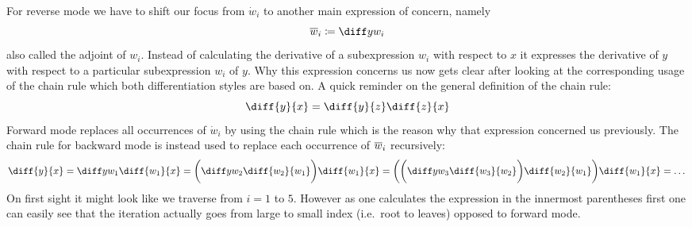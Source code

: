 For reverse mode we have to shift our focus from $\dot w_i$ to another main expression of concern, namely
\[ \overw{i} \coloneqq \diffyw{i} \]
also called the adjoint of $w_i$. Instead of calculating the derivative of a subexpression $w_i$ with respect to $x$ it expresses the derivative of $y$ with respect to a particular subexpression $w_i$ of $y$. Why this expression concerns us now gets clear after looking at the corresponding usage of the chain rule which both differentiation styles are based on. A quick reminder on the general definition of the chain rule:
\[ \diff{y}{x} = \diff{y}{z}\diff{z}{x} \]
Forward mode replaces all occurrences of $\dot w_i$ by using the chain rule which is the reason why that expression concerned us previously. The chain rule for backward mode is instead used to replace each occurrence of $\overline{w}_{i}$ recursively:
\newcommand{\diffw}[2]{\diff{w_{#1}}{w_{#2}}}
\[ \diff{y}{x} = \diffyw{1}\diff{w_1}{x} = \bigg(\diffyw{2}\diffw{2}{1}\bigg)\diff{w_1}{x} = \bigg(\bigg(\diffyw{3}\diffw{3}{2}\bigg)\diffw{2}{1}\bigg)\diff{w_1}{x} = \dots \]
On first sight it might look like we traverse from $i = 1$ to $5$. However as one calculates the expression in the innermost parentheses first one can easily see that the iteration actually goes from large to small index (i.e.\ root to leaves) opposed to forward mode.

